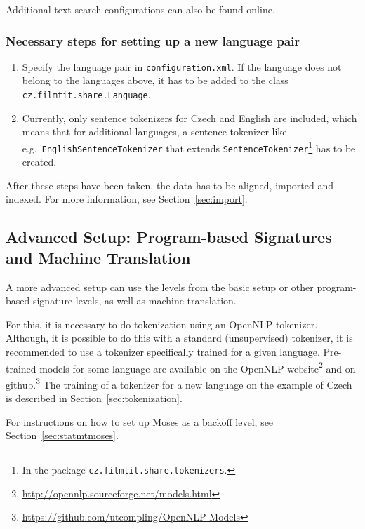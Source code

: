 Additional text search configurations can also be found online.

\subsubsection*{Necessary steps for setting up a new language pair}

\begin{enumerate}
	\item Specify the language pair in {\tt configuration.xml}. If the language does not belong to the languages above, it has to be added to the class {\tt cz.filmtit.share.Language}.
	\item Currently, only sentence tokenizers for Czech and English are included, which means that for additional languages, a sentence tokenizer like e.g.\ {\tt EnglishSentenceTokenizer} that extends {\tt SentenceTokenizer}\footnote{In the package {\tt cz.filmtit.share.tokenizers}.} has to be created.
\end{enumerate}

After these steps have been taken, the data has to be aligned, imported and indexed. For more information, see Section~\ref{sec:import}.


\subsection{Advanced Setup: Program-based Signatures and Machine Translation}

A more advanced setup can use the levels from the basic setup or other program-based signature levels, as well as machine translation. 

For this, it is necessary to do tokenization using an OpenNLP tokenizer. Although, it is possible to do this with a standard (unsupervised) tokenizer, it is recommended to use a tokenizer specifically trained for a given language. Pre-trained models for some language are available on the OpenNLP website\footnote{\url{http://opennlp.sourceforge.net/models.html}} and on github.\footnote{\url{https://github.com/utcompling/OpenNLP-Models}} The training of a tokenizer for a new language on the example of Czech is described in Section~\ref{sec:tokenization}. 

For instructions on how to set up Moses as a backoff level, see Section~\ref{sec:statmtmoses}.



